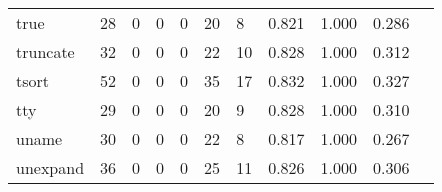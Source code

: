 \begin{longtable}{lp{1.2cm}p{1.2cm}p{1.2cm}p{1.2cm}p{1.2cm}p{1.2cm}p{1.2cm}p{1.2cm}p{1.2cm}p{1.2cm}}
true      &                                    28 &                                                  0 &                                                  0 &                                                  0 &                                                 20 &                                                  8 &                                         0.821 &                                              1.000 &                                              0.286 \\
truncate  &                                    32 &                                                  0 &                                                  0 &                                                  0 &                                                 22 &                                                 10 &                                         0.828 &                                              1.000 &                                              0.312 \\
tsort     &                                    52 &                                                  0 &                                                  0 &                                                  0 &                                                 35 &                                                 17 &                                         0.832 &                                              1.000 &                                              0.327 \\
tty       &                                    29 &                                                  0 &                                                  0 &                                                  0 &                                                 20 &                                                  9 &                                         0.828 &                                              1.000 &                                              0.310 \\
uname     &                                    30 &                                                  0 &                                                  0 &                                                  0 &                                                 22 &                                                  8 &                                         0.817 &                                              1.000 &                                              0.267 \\
unexpand  &                                    36 &                                                  0 &                                                  0 &                                                  0 &                                                 25 &                                                 11 &                                         0.826 &                                              1.000 &                                              0.306 \\

\end{longtable}
